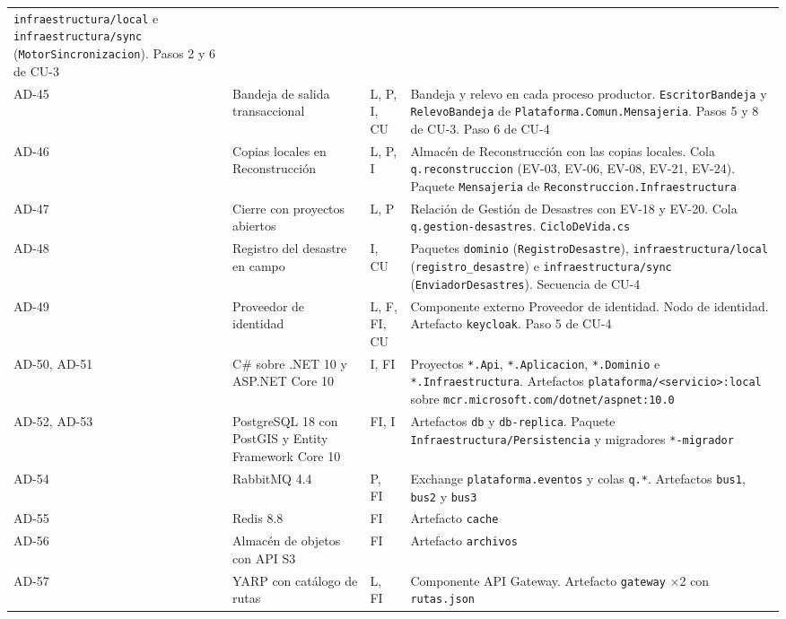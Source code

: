 \documentclass[11pt,letterpaper]{article}
\providecommand{\br}{\discretionary{}{}{}}
\begin{document}
\begin{longtable}{L{1.3cm} L{5.2cm} L{1.6cm} L{7.4cm}}
\texttt{infraestructura/\br{}local} e \texttt{infraestructura/\br{}sync}
(\texttt{MotorSincronizacion}). Pasos 2 y 6 de CU-3 \\
AD-45 & Bandeja de salida transaccional & L, P, I, CU & Bandeja y relevo en cada proceso
productor. \texttt{EscritorBandeja} y \texttt{RelevoBandeja} de
\texttt{Plataforma.\br{}Comun.\br{}Mensajeria}. Pasos 5 y 8 de CU-3. Paso 6 de CU-4 \\
AD-46 & Copias locales en Reconstrucción & L, P, I & Almacén de Reconstrucción con las copias
locales. Cola \texttt{q.\br{}reconstruccion} (EV-03, EV-06, EV-08, EV-21, EV-24). Paquete
\texttt{Mensajeria} de \texttt{Reconstruccion.\br{}Infraestructura} \\
AD-47 & Cierre con proyectos abiertos & L, P & Relación de Gestión de Desastres con EV-18 y EV-20.
Cola \texttt{q.\br{}gestion-\br{}desastres}. \texttt{CicloDeVida.\br{}cs} \\
AD-48 & Registro del desastre en campo & I, CU & Paquetes \texttt{dominio}
(\texttt{RegistroDesastre}), \texttt{infraestructura/\br{}local} (\texttt{registro\_\br{}desastre}) e
\texttt{infraestructura/\br{}sync} (\texttt{EnviadorDesastres}). Secuencia de CU-4 \\
AD-49 & Proveedor de identidad & L, F, FI, CU & Componente externo Proveedor de identidad. Nodo de
identidad. Artefacto \texttt{keycloak}. Paso 5 de CU-4 \\
AD-50, AD-51 & C\# sobre .NET 10 y ASP.NET Core 10 & I, FI & Proyectos \texttt{*.Api},
\texttt{*.Aplicacion}, \texttt{*.Dominio} e \texttt{*.\br{}Infraestructura}. Artefactos
\texttt{plataforma/\br{}<servicio>:\br{}local} sobre \texttt{mcr.\br{}microsoft.\br{}com/\br{}dotnet/\br{}aspnet:\br{}10.\br{}0} \\
AD-52, AD-53 & PostgreSQL 18 con PostGIS y Entity Framework Core 10 & FI, I & Artefactos
\texttt{db} y \texttt{db-replica}. Paquete \texttt{Infraestructura/\br{}Persistencia} y migradores
\texttt{*-migrador} \\
AD-54 & RabbitMQ 4.4 & P, FI & Exchange \texttt{plataforma.\br{}eventos} y colas \texttt{q.*}. Artefactos
\texttt{bus1}, \texttt{bus2} y \texttt{bus3} \\
AD-55 & Redis 8.8 & FI & Artefacto \texttt{cache} \\
AD-56 & Almacén de objetos con API S3 & FI & Artefacto \texttt{archivos} \\
AD-57 & YARP con catálogo de rutas & L, FI & Componente API Gateway. Artefacto \texttt{gateway} ×2
con \texttt{rutas.json} \\

\end{longtable}
\end{document}
